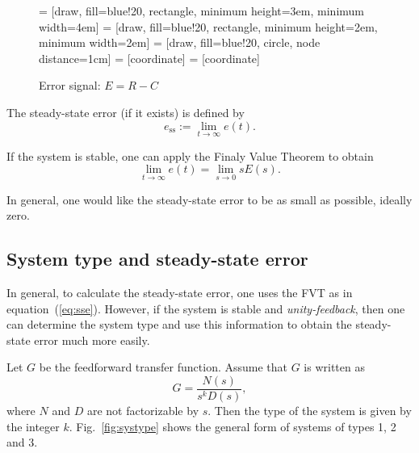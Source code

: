 \documentclass[a4paper,11pt]{report}
\theoremstyle{definition}
\newcommand{\sse}{\mathrm{ss}}
\begin{document}
\begin{figure}[H]
  \centering
   = [draw, fill=blue!20, rectangle, minimum height=3em, minimum width=4em]
   = [draw, fill=blue!20, rectangle, minimum height=2em, minimum width=2em]
   = [draw, fill=blue!20, circle, node distance=1cm]
   = [coordinate]
   = [coordinate]
  \caption{Error signal: $E=R-C$}
  \label{fig:sse}
\end{figure}

The steady-state error (if it exists) is defined by
\begin{equation}
  \label{eq:sse}
  e_\sse := \lim_{t\to\infty} e(t).
\end{equation}

If the system is stable, one can apply the Finaly Value Theorem to obtain
\[
\lim_{t\to\infty} e(t) = \lim_{s\to 0} sE(s).
\]

In general, one would like the steady-state error to be as small as
possible, ideally zero.

\subsection{System type and steady-state error}

In general, to calculate the steady-state error, one uses the FVT as
in equation~(\ref{eq:sse}). However, if the system is stable and
\emph{unity-feedback}, then one can determine the system type and use
this information to obtain the steady-state error much more easily.

Let $G$ be the feedforward transfer function. Assume that $G$ is
written as
\[
G=\frac{N(s)}{s^kD(s)},
\]
where $N$ and $D$ are not factorizable by $s$. Then the type of the
system is given by the integer $k$. Fig.~\ref{fig:systype} shows the
general form of systems of types 1, 2 and 3.
\end{document}
